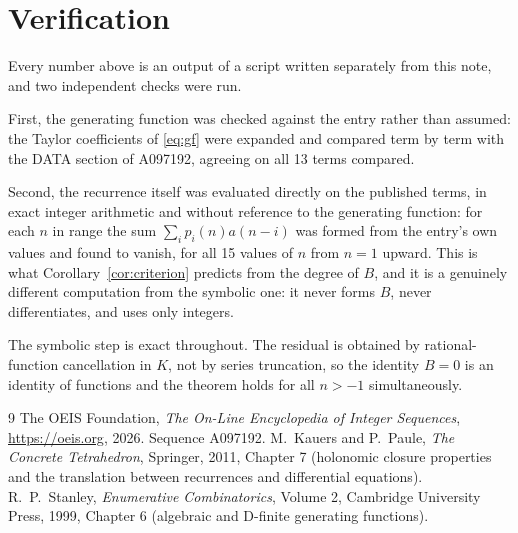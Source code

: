 \documentclass[11pt,a4paper]{article}
\theoremstyle{plain}
\theoremstyle{definition}
\begin{document}
\section{Verification}

Every number above is an output of a script written separately from this note, and two
independent checks were run.

First, the generating function was checked against the entry rather than assumed: the
Taylor coefficients of \eqref{eq:gf} were expanded and compared term by term with the DATA
section of A097192, agreeing on all 13 terms compared.

Second, the recurrence itself was evaluated directly on the published terms, in exact
integer arithmetic and without reference to the generating function: for each $n$ in range
the sum $\sum_{i}p_{i}(n)a(n-i)$ was formed from the entry's own values and found to
vanish, for all 15 values of $n$ from $n=1$ upward. This is what
Corollary~\ref{cor:criterion} predicts from the degree of $B$, and it is a genuinely
different computation from the symbolic one: it never forms $B$, never differentiates, and
uses only integers.

The symbolic step is exact throughout. The residual is obtained by rational-function
cancellation in $K$, not by series truncation, so the identity $B=0$ is an
identity of functions and the theorem holds for all $n>-1$ simultaneously.

\begin{thebibliography}{9}
 The OEIS Foundation, \emph{The On-Line Encyclopedia of Integer Sequences},
\url{https://oeis.org}, 2026. Sequence A097192.
 M.~Kauers and P.~Paule, \emph{The Concrete Tetrahedron}, Springer, 2011,
Chapter 7 (holonomic closure properties and the translation between recurrences and
differential equations).
 R.~P.~Stanley, \emph{Enumerative Combinatorics}, Volume 2, Cambridge
University Press, 1999, Chapter 6 (algebraic and D-finite generating functions).
\end{thebibliography}
\end{document}
